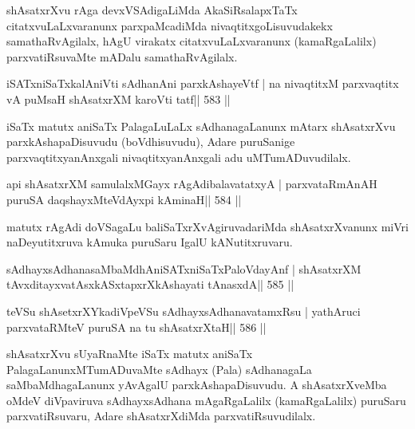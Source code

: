 \begin{artha}
shAsatxrXvu rAga devxVSAdigaLiMda AkaSiRsalapxTaTx citatxvuLaLxvaranunx  parxpaMcadiMda nivaqtitxgoLisuvudakekx samathaRvAgilalx, hAgU virakatx citatxvuLaLxvaranunx (kamaRgaLalilx) parxvatiRsuvaMte mADalu samathaRvAgilalx.
\end{artha}

\begin{shl}
iSATxniSaTxkalAniVti sAdhanAni parxkAshayeVtf |
na nivaqtitxM parxvaqtitx vA puMsaH shAsatxrXM karoVti tatf\hfill || 583 ||
\end{shl}

\begin{artha}
iSaTx matutx aniSaTx PalagaLuLaLx sAdhanagaLanunx mAtarx shAsatxrXvu parxkAshapaDisuvudu (boVdhisuvudu), Adare puruSanige parxvaqtitxyanAnxgali nivaqtitxyanAnxgali adu uMTumADuvudilalx.
\end{artha}



\begin{shl}
api shAsatxrXM samulalxMGayx rAgAdibalavatatxyA |
parxvataRmAnAH puruSA daqshayxMteV\s dAyxpi kAminaH\hfill || 584 ||
\end{shl}

\begin{artha}
matutx rAgAdi doVSagaLu baliSaTxrXvAgiruvadariMda shAsatxrXvanunx miVri naDeyutitxruva kAmuka puruSaru IgalU kANutitxruvaru.
\end{artha}

\begin{shl}
sAdhayxsAdhanasaMbaMdhAniSATxniSaTxPaloVdayAnf |
shAsatxrXM tAvxditayxvatAsxkASxtapxrXkAshayati tAnasxdA\hfill || 585 ||
\end{shl}

\begin{shl}
teVSu shAsetxrXYkadiVpeVSu sAdhayxsAdhanavatamxRsu |
yathAruci parxvataRMteV puruSA na tu shAsatxrXtaH\hfill || 586 ||
\end{shl}

\begin{artha}
shAsatxrXvu sUyaRnaMte iSaTx matutx aniSaTx PalagaLanunxMTumADuvaMte sAdhayx (Pala) sAdhanagaLa saMbaMdhagaLanunx yAvAgalU parxkAshapaDisuvudu. A shAsatxrXveMba oMdeV diVpaviruva sAdhayxsAdhana mAgaRgaLalilx (kamaRgaLalilx) puruSaru parxvatiRsuvaru, Adare shAsatxrXdiMda parxvatiRsuvudilalx.
\end{artha}

